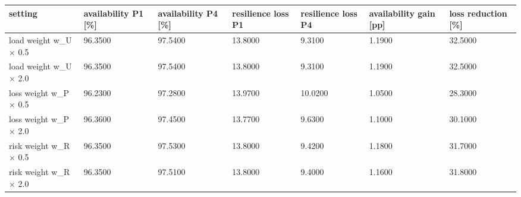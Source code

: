 \begin{tabular}{lllllll}
\toprule
setting & availability P1 [\%] & availability P4 [\%] & resilience loss P1 & resilience loss P4 & availability gain [pp] & loss reduction [\%] \\
\midrule
load weight w\_U × 0.5 & 96.3500 & 97.5400 & 13.8000 & 9.3100 & 1.1900 & 32.5000 \\
load weight w\_U × 2.0 & 96.3500 & 97.5400 & 13.8000 & 9.3100 & 1.1900 & 32.5000 \\
loss weight w\_P × 0.5 & 96.2300 & 97.2800 & 13.9700 & 10.0200 & 1.0500 & 28.3000 \\
loss weight w\_P × 2.0 & 96.3600 & 97.4500 & 13.7700 & 9.6300 & 1.1000 & 30.1000 \\
risk weight w\_R × 0.5 & 96.3500 & 97.5300 & 13.8000 & 9.4200 & 1.1800 & 31.7000 \\
risk weight w\_R × 2.0 & 96.3500 & 97.5100 & 13.8000 & 9.4000 & 1.1600 & 31.8000 \\
\bottomrule
\end{tabular}
